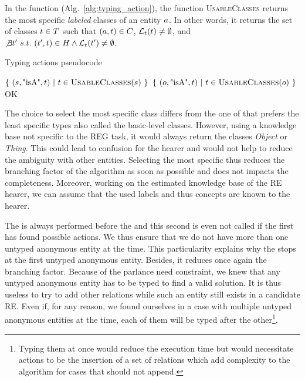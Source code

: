 In the \typingactions{} function (Alg.~\ref{alg:typing_action}), the function \textsc{UsableClasses} returns the most specific \textit{labeled} classes of an entity $a$. In other words, it returns the set of classes $t \in T$ such that $(a,t) \in C$, $\mathcal{L}_t(t) \neq \emptyset$, and
$\not\exists t'\ s.t.\ (t', t) \in H \wedge \mathcal{L}_t(t') \neq \emptyset$.

\begin{algorithm}[htb!]
\caption{\label{alg:typing_action} Typing actions pseudocode}
\begin{algorithmic}

        
                \State \Return $\{\ (s,\text{"isA"},t)\ |\ t \in \textsc{UsableClasses}(s)\  \}$
                \State \Return $\{\ (o,\text{"isA"},t)\ |\ t \in \textsc{UsableClasses}(o)\  \}$
            \EndIf
        \EndFor
        \Return OK 
    \EndFunction
\end{algorithmic}
\end{algorithm}

The choice to select the most specific class differs from the one of \cite{dale_1995_computational} that prefers the least specific types also called the basic-level classes. However, using a knowledge base not specific to the REG task, it would always return the classes \textit{Object} or \textit{Thing}. This could lead to confusion for the hearer and would not help to reduce the ambiguity with other entities. Selecting the most specific thus reduces the branching factor of the algorithm as soon as possible and does not impacts the completeness. Moreover, working on the estimated knowledge base of the RE hearer, we can assume that the used labels and thus concepts are known to the hearer.

The \typingactions{} is always performed before the \differenceactions{} and this second is even not called if the first has found possible actions. We thus ensure that we do not have more than one untyped anonymous entity at the time. This particularity explains why the \typingactions{} stops at the first untyped anonymous entity. Besides, it reduces once again the branching factor. Because of the parlance need constraint, we knew that any untyped anonymous entity has to be typed to find a valid solution. It is thus useless to try to add other relations while such an entity still exists in a candidate RE. Even if, for any reason, we found ourselves in a case with multiple untyped anonymous entities at the time, each of them will be typed after the other\footnote{Typing them at once would reduce the execution time but would necessitate actions to be the insertion of a set of relations which add complexity to the algorithm for cases that should not append.}.

